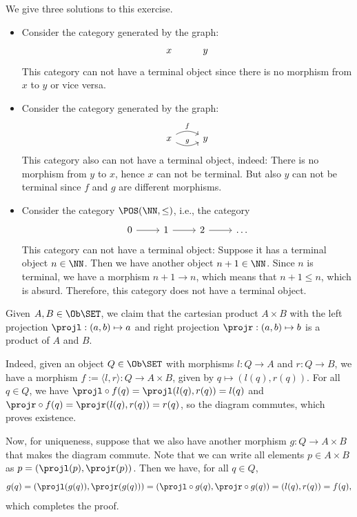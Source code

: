 \begin{solution}\label{sol:cat-without-terminal}
We give three solutions to this exercise.
\begin{itemize}
\item Consider the category generated by the graph: 
\[
\begin{tikzcd}
x & y
\end{tikzcd}
\]
This category can not have a terminal object since there is no morphism from $x$ to $y$ or vice versa.
\item Consider the category generated by the graph: 
\[
\begin{tikzcd}
x \arrow[r, bend left, "f"] \arrow[r, bend right, "g"] & y
\end{tikzcd}
\]
This category also can not have a terminal object, indeed: There is no morphism from $y$ to $x$, hence $x$ can not be terminal. But also $y$ can not be terminal since $f$ and $g$ are different morphisms.
\item Consider the category $ \POS(\NN, \leq) $, i.e., the category
\[
\begin{tikzcd}
	0 \arrow[r] & 1 \arrow[r] & 2 \arrow[r] & \dots
\end{tikzcd}
\]
This category can not have a terminal object: Suppose it has a terminal object $ n \in \NN $. Then we have another object $ n + 1 \in \NN $. Since $ n $ is terminal, we have a morphism $ n + 1 \to n $, which means that $ n + 1 \leq n $, which is absurd. Therefore, this category does not have a terminal object.
\end{itemize}
\end{solution}

\begin{solution}\label{sol:product_set}
	Given $ A, B \in \Ob \SET $, we claim that the cartesian product $ A \times B $ with the left projection $ \projl: (a, b) \mapsto a $ and right projection $ \projr: (a, b) \mapsto b $ is a product of $ A $ and $ B $.

	Indeed, given an object $ Q \in \Ob \SET $ with morphisms $ l: Q \to A $ and $ r: Q \to B $, we have a morphism $ f := \langle l, r \rangle : Q \to A \times B $, given by $ q \mapsto (l(q), r(q)) $. For all $ q \in Q $, we have $ \projl \circ f(q) = \projl(l(q), r(q)) = l(q) $ and $ \projr \circ f(q) = \projr(l(q), r(q)) = r(q) $, so the diagram commutes, which proves existence.

	Now, for uniqueness, suppose that we also have another morphism $ g: Q \to A \times B $ that makes the diagram commute. Note that we can write all elements $ p \in A \times B $ as $ p = (\projl(p), \projr(p)) $. Then we have, for all $ q \in Q $,
	\[ g(q) = (\projl(g(q)), \projr(g(q))) = (\projl \circ g(q), \projr \circ g(q)) = (l(q), r(q)) = f(q), \]
	which completes the proof.
\end{solution}

